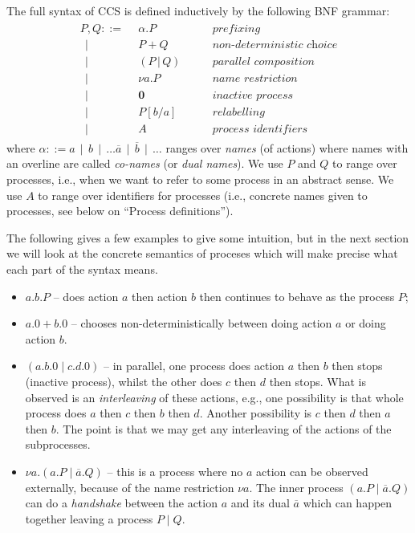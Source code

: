 \documentclass{article}
\theoremstyle{definition}
\begin{document}
The full syntax of CCS is defined inductively by the following BNF grammar:
%
\begin{align*}
  \begin{array}{rll}
  P, Q ::= \;\, & \alpha . P & \qquad \textit{prefixing} \\
    \;\,\mid & P + Q & \qquad \textit{non-deterministic choice}  \\
    \;\,\mid &  (P \, | \, Q) & \qquad \textit{parallel composition} \\
    \;\,\mid & \nu a . P & \qquad \textit{name restriction} \\
    \;\,\mid & \mathbf{0} & \qquad \textit{inactive process} \\
    \;\,\mid & P[b/a] & \qquad \textit{relabelling} \\
    \;\,\mid & A & \qquad \textit{process identifiers}
  \end{array}
\end{align*}
%
where  $\alpha ::= a \,\mid\, b \,\mid\, \ldots \overline{a} \,\mid\,
\overline{b} \,\mid\, \ldots$
ranges over \emph{names} (of actions)
where names with an overline are called \emph{co-names} (or \emph{dual
  names}). We use $P$ and $Q$ to range over processes, i.e., when
we want to refer to some process in an abstract sense. We use
$A$ to range over identifiers for processes (i.e., concrete names
given to processes, see below on ``Process definitions'').

The following gives a few examples to give some intuition, but in the
next section we will look at the concrete semantics of proceses
which will make precise what each part of the syntax means.
%
\begin{itemize}
  \item $a. b. P$ -- does action $a$ then action $b$ then continues to
  behave as the process $P$;
  \item $a.0 + b.0$ -- chooses non-deterministically between doing
  action $a$ or doing action $b$.
  \item $(a.b.0 \mid c.d.0)$ -- in parallel, one process does action $a$
  then $b$ then stops (inactive process), whilst the other does $c$
  then $d$ then stops. What is observed is an \emph{interleaving} of
  these actions, e.g., one possibility is that whole process does
  $a$ then $c$ then $b$ then $d$. Another possibility is $c$ then $d$
  then $a$ then $b$. The point is that we may get any interleaving of
  the actions of the subprocesses.
  \item $\nu a . (a . P \mid \overline{a} . Q)$ -- this is a process
  where no $a$ action can be observed externally, because of the name
  restriction $\nu a $. The inner process $(a . P \mid \overline{a}
  . Q)$ can do a \emph{handshake} between the action $a$ and its dual
  $\overline{a}$ which can happen together leaving a process $P \mid Q$.
\end{itemize}
%
\end{document}
